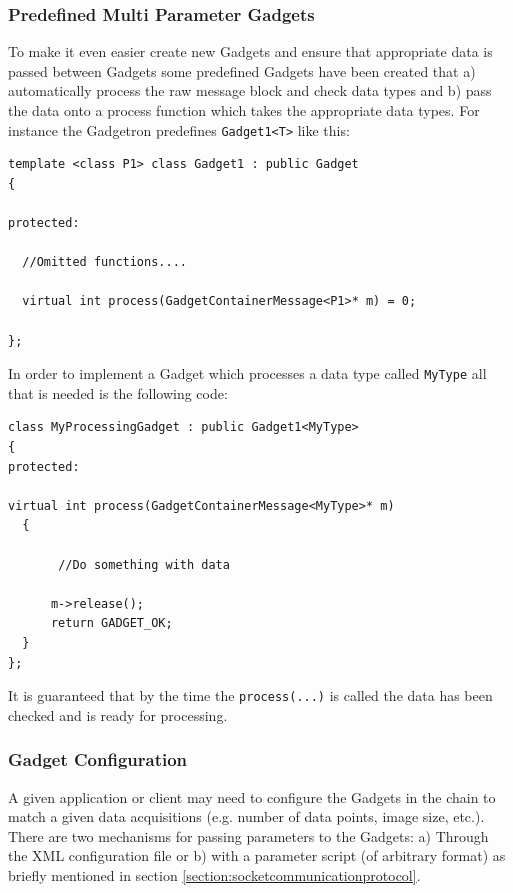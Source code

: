 \documentclass[11pt]{article}
\begin{document}
\subsubsection{Predefined Multi Parameter Gadgets}
To make it even easier create new Gadgets and ensure that appropriate data is passed between Gadgets some predefined Gadgets have been created that a) automatically process the raw message block and check data types and b) pass the data onto a process function which takes the appropriate data types. For instance the Gadgetron predefines \texttt{Gadget1<T>} like this:

{\scriptsize 
\begin{verbatim}
template <class P1> class Gadget1 : public Gadget
{
  
protected:

  //Omitted functions....

  virtual int process(GadgetContainerMessage<P1>* m) = 0;

};
\end{verbatim}}

\noindent
In order to implement a Gadget which processes a data type called \texttt{MyType} all that is needed is the following code:
{\scriptsize 
\begin{verbatim}
class MyProcessingGadget : public Gadget1<MyType>
{  
protected:

virtual int process(GadgetContainerMessage<MyType>* m)
  {
  
       //Do something with data
       
      m->release();
      return GADGET_OK;
  }
};
\end{verbatim}}

\noindent
It is guaranteed that by the time the \texttt{process(...)} is called the data has been checked and is ready for processing. 

\subsubsection{Gadget Configuration}
A given application or client may need to configure the Gadgets in the chain to match a given data acquisitions (e.g. number of data points, image size, etc.). There are two mechanisms for passing parameters to the Gadgets: a) Through the XML configuration file or b) with a parameter script (of arbitrary format) as briefly mentioned in section \ref{section:socketcommunicationprotocol}.
\end{document}
